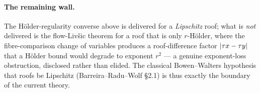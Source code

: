 \paragraph{The remaining wall.} The Hölder-regularity converse above is delivered for a
\emph{Lipschitz} roof; what is \emph{not} delivered is the flow-Livšic theorem for a roof that is only
\(r\)-Hölder, where the fibre-comparison change of variables produces a roof-difference factor
\(\left\lvert \tau x - \tau y \right\rvert\) that a Hölder bound would degrade to exponent \(r^2\) --- a genuine
exponent-loss obstruction, disclosed rather than elided. The classical Bowen--Walters hypothesis that
roofs be Lipschitz (Barreira--Radu--Wolf \S2.1) is thus exactly the boundary of the current theory.

